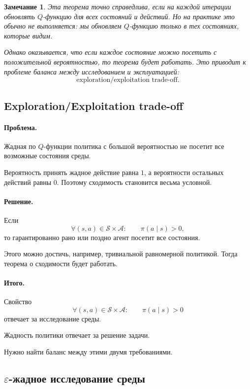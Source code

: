 \documentclass[12pt,a4paper]{article}
\newtheorem{remark}{Замечание}
\begin{document}
\begin{remark}
Эта теорема точно справедлива, если на каждой итерации обновлять $Q$-функцию для всех состояний и действий. Но на практике это обычно не выполняется: мы обновляем $Q$-функцию только в тех состояниях, которые видим.

Однако оказывается, что если каждое состояние можно посетить с положительной вероятностью, то теорема будет работать. Это приводит к проблеме баланса между исследованием и эксплуатацией:
\[
\text{exploration/exploitation trade-off}.
\]
\end{remark}

\subsection{Exploration/Exploitation trade-off}

\paragraph{Проблема.}

Жадная по $Q$-функции политика с большой вероятностью не посетит все возможные состояния среды.

Вероятность принять жадное действие равна $1$, а вероятности остальных действий равны $0$. Поэтому сходимость становится весьма условной.

\paragraph{Решение.}

Если
\[
\forall (s,a) \in \mathcal S \times \mathcal A:
\qquad
\pi(a\mid s)>0,
\]
то гарантированно рано или поздно агент посетит все состояния.

Этого можно достичь, например, тривиальной равномерной политикой. Тогда теорема о сходимости будет работать.

\paragraph{Итого.}

Свойство
\[
\forall (s,a) \in \mathcal S \times \mathcal A:
\qquad
\pi(a\mid s)>0
\]
отвечает за исследование среды.

Жадность политики отвечает за решение задачи.

Нужно найти баланс между этими двумя требованиями.

\subsection{$\varepsilon$-жадное исследование среды}
\end{document}
